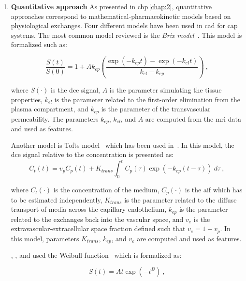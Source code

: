 \begin{enumerate}[leftmargin=*]
\item[] \textbf{Quantitative approach}
As presented in \acs{chp}\,\ref{chap:2}, quantitative approaches correspond to
mathematical-pharmacokinetic models based on physiological exchanges.
Four different models have been used in \ac{cad} for \ac{cap} systems.
The most common model reviewed is the \textit{Brix
  model}~\cite{Artan2009,Artan2010,Sung2011,Liu2009,Ozer2009,Ozer2010,Lemaitre2016thesis}.
This model is formalized such as:

\begin{equation}
  \frac{S(t)}{S(0)} = 1 + A k_{ep} \left( \frac{\exp( -k_{ep} t ) - \exp(
      -k_{el} t )}{k_{el} - k_{ep}} \right) \ ,
  \label{eq:brixmod}
\end{equation}

\noindent where $S(\cdot)$ is the \ac{dce} signal, $A$ is the parameter
simulating the tissue properties, $k_{el}$ is the parameter related to the
first-order elimination from the plasma compartment, and $k_{ep}$ is the
parameter of the transvascular permeability.
The parameters $k_{ep}$, $k_{el}$, and $A$ are computed from the \ac{mri} data
and used as features.

Another model is Tofts model~\cite{Tofts1997} which has been used
in~\cite{Langer2009,Giannini2013,Niaf2011,Niaf2012,Mazzetti2011,lehaire2014computer,giannini2015fully,Lemaitre2016thesis}.
In this model, the \ac{dce} signal relative to the concentration is presented
as:
\begin{equation}
  C_t(t) = v_p C_p(t) + K_{trans} \int_{0}^{t} C_p(\tau) \exp( -k_{ep}(t-\tau)
  ) \ d\tau \ ,
  \label{eq:tofts}
\end{equation}

\noindent where $C_t(\cdot)$ is the concentration of the medium, $C_p(\cdot)$
is the \ac{aif} which has to be estimated independently, $K_{trans}$ is the
parameter related to the diffuse transport of media across the capillary
endothelium, $k_{ep}$ is the parameter related to the exchanges back into the
vascular space, and $v_e$ is the extravascular-extracellular space fraction
defined such that $v_e = 1 - v_p$.
In this model, parameters $K_{trans}$, $k_{ep}$, and $v_e$ are computed and
used as features.

\citeauthor{Mazzetti2011}, \citeauthor{giannini2015fully}, and
\citeauthor{Lemaitre2016thesis} used the Weibull
function~\cite{Mazzetti2011,Giannini2013,giannini2015fully,Lemaitre2016thesis}
which is formalized as:

\begin{equation}
  S(t) = A t \exp( -t^{B} ) \ ,
  \label{eq:weibull}
\end{equation}


\end{enumerate}
